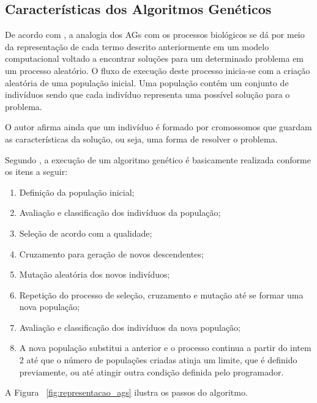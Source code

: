 \subsection{Características dos Algoritmos Genéticos}

\par De acordo com , a analogia dos AGs com
os processos biológicos se dá por meio da representação de cada termo descrito
anteriormente em um modelo computacional voltado a encontrar soluções para um
determinado problema em um processo aleatório. O fluxo de execução deste processo
inicia-se com a criação aleatória de uma população inicial. Uma população contém
um conjunto de indivíduos sendo que cada indivíduo  representa uma possível solução
para o problema.

\par O autor afirma ainda que um indivíduo é formado por cromossomos que
guardam as características da solução, ou seja, uma forma de resolver o
problema.

\par Segundo , a execução de um 
algoritmo genético é basicamente realizada conforme os itens a seguir:

\begin{enumerate}
	\item Definição da população inicial;
	\item Avaliação e classificação dos indivíduos da população;
	\item Seleção de acordo com a qualidade;
	\item Cruzamento para geração de novos descendentes;
	\item Mutação aleatória dos novos indivíduos;
	\item Repetição do processo de seleção, cruzamento e mutação até se formar uma nova população;
	\item Avaliação e classificação dos indivíduos da nova população;
	\item A nova população substitui a anterior e o processo continua a partir do
	intem 2 até que o número de populações criadas atinja um limite, que é definido
	previamente, ou até atingir outra condição definida pelo programador.
\end{enumerate}

\par A Figura ~\ref{fig:representacao_ags} ilustra os passos do algoritmo.


